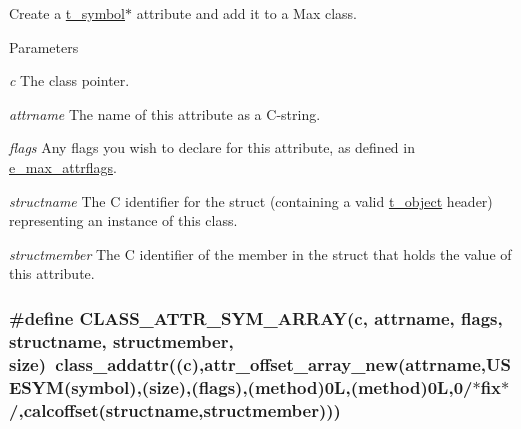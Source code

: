 Create a \hyperlink{structt__symbol}{t\_\-symbol}$\ast$ attribute and add it to a Max class. 
\begin{DoxyParams}{Parameters}
\item[{\em c}]The class pointer. \item[{\em attrname}]The name of this attribute as a C-\/string. \item[{\em flags}]Any flags you wish to declare for this attribute, as defined in \hyperlink{group__attr_gaf296cfc6741bb19207f6ed8062809115}{e\_\-max\_\-attrflags}. \item[{\em structname}]The C identifier for the struct (containing a valid \hyperlink{structt__object}{t\_\-object} header) representing an instance of this class. \item[{\em structmember}]The C identifier of the member in the struct that holds the value of this attribute. \end{DoxyParams}
\hypertarget{group__attr_ga793a0a04f57f52eb60ad3d84c5d46b61}{
\subsubsection[{CLASS\_\-ATTR\_\-SYM\_\-ARRAY}]{\setlength{\rightskip}{0pt plus 5cm}\#define CLASS\_\-ATTR\_\-SYM\_\-ARRAY(c, \/  attrname, \/  flags, \/  structname, \/  structmember, \/  size)~class\_\-addattr((c),attr\_\-offset\_\-array\_\-new(attrname,USESYM(symbol),(size),(flags),({\bf method})0L,(method)0L,0/$\ast$fix$\ast$/,calcoffset(structname,structmember)))}}
\label{group__attr_ga793a0a04f57f52eb60ad3d84c5d46b61}



